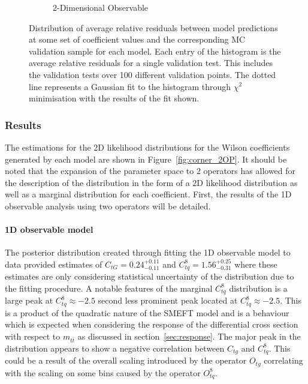 \documentclass[a4paper,11pt]{article}
\begin{document}
\begin{figure}[H]
\begin{subfigure}[b]{0.4\textwidth}
        \caption{2-Dimensional Observable}
    \end{subfigure}
    \caption{Distribution of average relative residuals between model predictions at some set of coefficient values and the corresponding MC validation sample for each model. Each entry of the histogram is the average relative residuals for a single validation test. This includes the validation tests over 100 different validation points. The dotted line represents a Gaussian fit to the histogram through $\chi^2$ minimisation with the results of the fit shown.}
    \label{fig:residuals_hist}
\end{figure}

\subsubsection{Results}

The estimations for the 2D likelihood distributions for the Wilson coefficients generated by each model are shown in Figure~\ref{fig:corner_2OP}.
It should be noted that the expansion of the parameter space to 2 operators has allowed for the description of the distribution in the form of a 2D likelihood distribution as well as a marginal distribution for each coefficient.
First, the results of the 1D observable analysis using two operators will be detailed.

\paragraph{1D observable model}

The posterior distribution created through fitting the 1D observable model to data provided estimates of $C_{tG}=0.24^{+0.11}_{-0.11}$ and $C_{tq}^{8}=1.56^{+0.25}_{-0.31}$ where these estimates are only considering statistical uncertainty of the distribution due to the fitting procedure.
A notable features of the marginal $C_{tq}^{8}$ distribution is a large peak at $C_{tq}^{8}\approx-2.5$ second less prominent peak located at $C_{tq}^{8}\approx-2.5$.
This is a product of the quadratic nature of the SMEFT model and is a behaviour which is expected when considering the response of the differential cross section with respect to $m_{t\bar{t}}$ as discussed in section~\ref{sec:response}.
The major peak in the distribution appears to show a negative correlation between $C_{tg}$ and $C_{tq}^8$.
This could be a result of the overall scaling introduced by the operator $O_{tg}$ correlating with the scaling on some bins caused by the operator $O_{tq}^{8}$.
\end{document}
